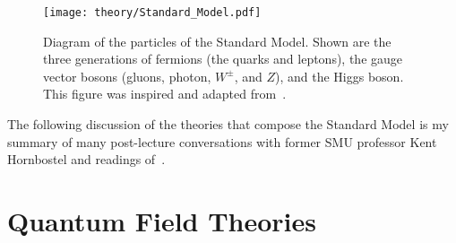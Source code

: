 \begin{figure}
 \centering
 \texttt{[image: theory/Standard\_Model.pdf]}
 \caption[Diagram of the particles of the Standard Model.]{%
  Diagram of the particles of the Standard Model.
  Shown are the three generations of fermions (the quarks and leptons), the gauge vector bosons (gluons, photon, $W^{\pm}$, and $Z$), and the Higgs boson.
  This figure was inspired and adapted from~\cite{web:Carsten_Burgard}.}
 \label{fig:Standard_Model}
\end{figure}

The following discussion of the theories that compose the Standard Model is my summary of many post-lecture conversations with former SMU professor Kent Hornbostel and readings of~\cite{Pich:2005mk}.

\section{Quantum Field Theories}\label{section:QFT}

